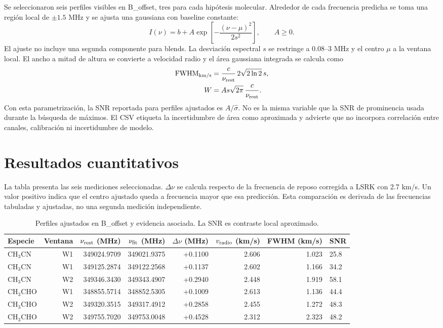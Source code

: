 \documentclass[10pt]{article}
\begin{document}
Se seleccionaron seis perfiles visibles en B\_offset, tres para cada hipótesis molecular. Alrededor de cada frecuencia predicha se toma una región local de $\pm1.5$ MHz y se ajusta una gaussiana con baseline constante:
\begin{equation}
I(\nu)=b+A\exp\left[-\frac{(\nu-\mu)^2}{2s^2}\right],\qquad A\geq0.
\end{equation}
El ajuste no incluye una segunda componente para blends. La desviación espectral $s$ se restringe a 0.08--3 MHz y el centro $\mu$ a la ventana local. El ancho a mitad de altura se convierte a velocidad radio y el área gaussiana integrada se calcula como
\begin{align}
\mathrm{FWHM}_{\rm km/s}&=\frac{c}{\nu_{\rm rest}}\,2\sqrt{2\ln2}\,s,\\
W&=A s\sqrt{2\pi}\,\frac{c}{\nu_{\rm rest}}.
\end{align}
Con esta parametrización, la SNR reportada para perfiles ajustados es $A/\widehat{\sigma}$. No es la misma variable que la SNR de prominencia usada durante la búsqueda de máximos. El CSV etiqueta la incertidumbre de área como aproximada y advierte que no incorpora correlación entre canales, calibración ni incertidumbre de modelo.

\section{Resultados cuantitativos}
La tabla presenta las seis mediciones seleccionadas. $\Delta\nu$ se calcula respecto de la frecuencia de reposo corregida a LSRK con 2.7 km/s. Un valor positivo indica que el centro ajustado queda a frecuencia mayor que esa predicción. Esta comparación es derivada de las frecuencias tabuladas y ajustadas, no una segunda medición independiente.

\begin{table}[!ht]
\centering\footnotesize
\caption{Perfiles ajustados en B\_offset y evidencia asociada. La SNR es contraste local aproximado.}
\begin{tabularx}{\linewidth}{@{}l r r r r r r X@{}}
\toprule
Especie & Ventana & $\nu_{\rm rest}$ (MHz) & $\nu_{\rm fit}$ (MHz) & $\Delta\nu$ (MHz) & $v_{\rm radio}$ (km/s) & FWHM (km/s) & SNR\\
\midrule
CH$_3$CN & W1 & 349024.9709 & 349021.9375 & +0.1100 & 2.606 & 1.023 & 25.8\\
CH$_3$CN & W1 & 349125.2874 & 349122.2568 & +0.1137 & 2.602 & 1.166 & 34.2\\
CH$_3$CN & W2 & 349346.3430 & 349343.4907 & +0.2940 & 2.448 & 1.919 & 58.1\\
CH$_3$CHO & W1 & 348855.5714 & 348852.5305 & +0.1009 & 2.613 & 1.136 & 44.4\\
CH$_3$CHO & W2 & 349320.3515 & 349317.4912 & +0.2858 & 2.455 & 1.272 & 48.3\\
CH$_3$CHO & W2 & 349755.7020 & 349753.0048 & +0.4528 & 2.312 & 2.323 & 48.2\\
\bottomrule
\end{tabularx}
\end{table}
\end{document}
